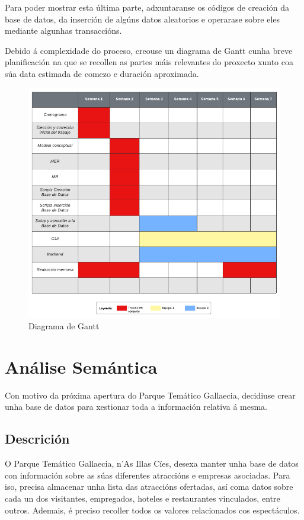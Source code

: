 \documentclass[12pt,a4paper]{book}
\theoremstyle{definition}
\theoremstyle{break}
\begin{document}
	Para poder mostrar esta última parte, adxuntaranse os códigos de creación da base de datos, da inserción de algúns datos aleatorios e operarase sobre eles mediante algunhas transaccións. 
	
	Debido á complexidade do proceso, creouse un diagrama de Gantt cunha breve planificación na que se recollen as partes máis relevantes do proxecto xunto coa súa data estimada de comezo e duración aproximada. 
	
	\begin{figure} [H] \centering
		\caption{Diagrama de Gantt}
		\includegraphics[width=\textwidth]{Diagrama de Gantt.pdf}
	\end{figure}
	
	
	\chapter{Análise Semántica}
	Con motivo da próxima apertura do Parque Temático {\logo Gallaecia}, decidiuse crear unha base de datos para xestionar toda a información relativa á mesma.
	
	\section{Descrición}
	O Parque Temático {\logo Gallaecia}, n'As Illas Cíes, desexa manter unha base de datos con información sobre as súas diferentes atraccións e empresas asociadas. Para iso, precisa almacenar unha lista das atraccións ofertadas, así coma datos sobre cada un dos visitantes, empregados, hoteles e restaurantes vinculados, entre outros. Ademais, é preciso recoller todos os valores relacionados cos espectáculos.
	
\end{document}
